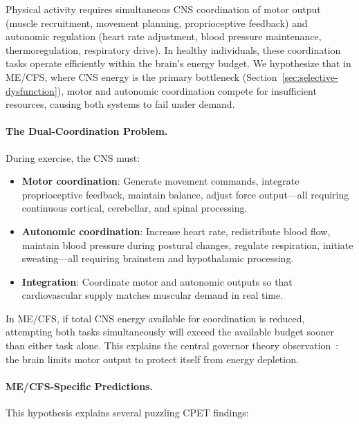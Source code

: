 \begin{hypothesis}
\label{hyp:motor-autonomic-coordination}

Physical activity requires simultaneous CNS coordination of motor output (muscle recruitment, movement planning, proprioceptive feedback) and autonomic regulation (heart rate adjustment, blood pressure maintenance, thermoregulation, respiratory drive). In healthy individuals, these coordination tasks operate efficiently within the brain's energy budget. We hypothesize that in ME/CFS, where CNS energy is the primary bottleneck (Section~\ref{sec:selective-dysfunction}), motor and autonomic coordination compete for insufficient resources, causing both systems to fail under demand.

\paragraph{The Dual-Coordination Problem.}
During exercise, the CNS must:

\begin{itemize}
    \item \textbf{Motor coordination}: Generate movement commands, integrate proprioceptive feedback, maintain balance, adjust force output---all requiring continuous cortical, cerebellar, and spinal processing.
    \item \textbf{Autonomic coordination}: Increase heart rate, redistribute blood flow, maintain blood pressure during postural changes, regulate respiration, initiate sweating---all requiring brainstem and hypothalamic processing.
    \item \textbf{Integration}: Coordinate motor and autonomic outputs so that cardiovascular supply matches muscular demand in real time.
\end{itemize}

In ME/CFS, if total CNS energy available for coordination is reduced, attempting both tasks simultaneously will exceed the available budget sooner than either task alone. This explains the central governor theory observation~\cite{Noakes2004governor,StClairGibson2004fatigue}: the brain limits motor output to protect itself from energy depletion.

\paragraph{ME/CFS-Specific Predictions.}
This hypothesis explains several puzzling CPET findings:


\end{hypothesis}
